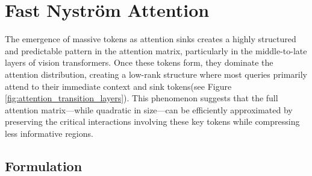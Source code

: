 \section{Fast Nystr\"om Attention}
\label{sec:fna}

The emergence of massive tokens as attention sinks creates a highly structured and predictable pattern in the attention matrix, particularly in the middle-to-late layers of vision transformers. Once these tokens form, they dominate the attention distribution, creating a low-rank structure where most queries primarily attend to their immediate context and sink tokens(see Figure \ref{fig:attention_transition_layers}). This phenomenon suggests that the full attention matrix—while quadratic in size—can be efficiently approximated by preserving the critical interactions involving these key tokens while compressing less informative regions. 

\subsection{Formulation}
\label{sec:formulation}



